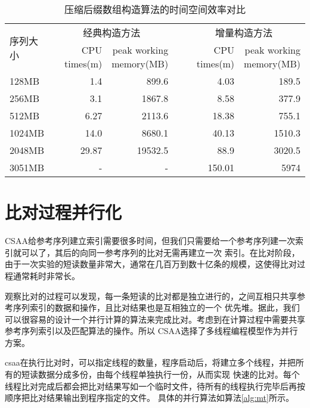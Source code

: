 \begin{table}
    \caption{压缩后缀数组构造算法的时间空间效率对比}
    \label{tab:index}
    \centering
    \begin{tabular}{lrrrrr}
        \toprule
        \multirow{2}{*}{序列大小}&\multicolumn{2}{c}{经典构造方法}& &\multicolumn{2}{c}{增量构造方法}\\
        \cline{2-3}
        \cline{5-6}
        &CPU times(m) & \tabincell{l}{peak working\\memory(MB)}&&CPU times(m)& \tabincell{l}{peak working \\memory(MB)}\\
        \midrule
        128MB& 1.4 & 899.6& & 4.03 & 189.5\\
        256MB& 3.1 & 1867.8& & 8.58 & 377.9\\
        512MB& 6.27 & 2113.6 & &18.38 & 755.1\\
        1024MB& 14.0 & 8680.1 & &40.13 & 1510.3\\
        2048MB& 29.87 & 19532.5 & &88.9 & 3020.5\\
        3051MB& - & - & &150.01 &5974\\
        \bottomrule
    \end{tabular}
\end{table}


\section{比对过程并行化}
CSAA给参考序列建立索引需要很多时间，但我们只需要给一个参考序列建一次索引就可以了，其后的向同一参考序列的比对无需再建立一次
索引。在比对阶段，由于一次实验的短读数量非常大，通常在几百万到数十亿条的规模，这使得比对过程通常耗时非常长。

观察比对的过程可以发现，每一条短读的比对都是独立进行的，之间互相只共享参考序列索引的数据和操作，且比对结果也是互相独立的一个
优先堆。据此，我们可以很容易的设计一个并行计算的算法来完成比对。考虑到在计算过程中需要共享参考序列索引以及匹配算法的操作。所以
CSAA选择了多线程编程模型作为并行方案。

csaa在执行比对时，可以指定线程的数量，程序启动后，将建立多个线程，并把所有的短读数据分成多份，由每个线程单独执行一份，从而实现
快速的比对。每个线程比对完成后都会把比对结果写如一个临时文件，待所有的线程执行完毕后再按顺序把比对结果输出到程序指定的文件。
具体的并行算法如算法\ref{alg:mt}所示。

